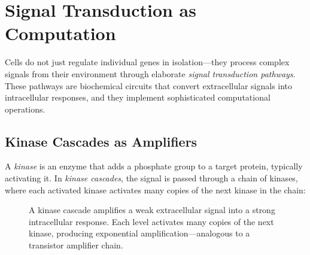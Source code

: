 \section{Signal Transduction as Computation}
\label{sec:signal-transduction}

Cells do not just regulate individual genes in isolation---they process complex signals from their environment through elaborate \emph{signal transduction pathways}. These pathways are biochemical circuits that convert extracellular signals into intracellular responses, and they implement sophisticated computational operations.

\subsection{Kinase Cascades as Amplifiers}

A \emph{kinase} is an enzyme that adds a phosphate group to a target protein, typically activating it. In \emph{kinase cascades}, the signal is passed through a chain of kinases, where each activated kinase activates many copies of the next kinase in the chain:

\begin{figure}[H]
\centering
{}
\caption{A kinase cascade amplifies a weak extracellular signal into a strong intracellular response. Each level activates many copies of the next kinase, producing exponential amplification---analogous to a transistor amplifier chain.}
\label{fig:kinase-cascade}
\end{figure}

